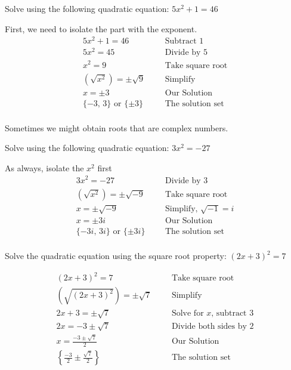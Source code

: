 %
\begin{exa}
    Solve using the following quadratic equation: $5x^2+1 =46$
\end{exa}
%
First, we need to isolate the part with the exponent.
	\begin{align*}
		5x^2+1 =46&          &&\text{Subtract $1$}\\
		5x^2 = 45&           &&\text{Divide by 5}\\
		x^2  = 9&            &&\text{Take square root}\\
		\left(\sqrt{x^2} \right) =\pm\sqrt{9}& &&\text{Simplify}\\
		x =\pm3& &&\text{Our Solution}\\
		\{-3,\,3\}\,\, \text{or} \,\, \{\pm3\}&
		&&\text{The solution set}\\
	\end{align*}
%
\begin{nt}
	Sometimes we might obtain roots that are complex numbers.
\end{nt}
%
\begin{exa}
    Solve using the following quadratic equation: $3x^2 =-27$
\end{exa}
As always, isolate the $x^2$ first
	\begin{align*}
		3x^2 =-27& &&\text{Divide by $3$}\\
		\left(\sqrt{x^2} \right) =\pm\sqrt{-9}& &&\text{Take square root}\\
		x =\pm\sqrt{-9}& &&\text{Simplify, $\sqrt{-1}=i$}\\
		x =\pm3i&  &&\text{Our Solution}\\
		\{-3i,\,3i\}\,\, \text{or}\,\, \{\pm3i\}& &&\text{The solution set}\\
	\end{align*}
%
\begin{exa}
    Solve the quadratic equation using the square root property:
    $(2x+3)^2 =7$
\end{exa}
%
	\begin{align*}
		(2x+3)^2 =7& &&\text{Take square root}\\
		\left(\sqrt{(2x+3)^2} \right) =\pm\sqrt{7}& &&\text{Simplify}\\
		2x+3 =\pm\sqrt{7}& &&\text{Solve for $x$, subtract $3$}\\
		2x =-3\pm\sqrt{7}& &&\text{Divide both sides by 2}\\
		x =\frac{-3\pm\sqrt{7}}{2}& &&\text{Our Solution}\\
        \left\{\frac{-3}{2}\pm\frac{\sqrt{7}}{2}\right\} &
		&&\text{The solution set}
	\end{align*}
